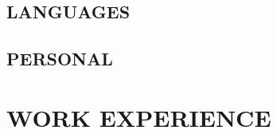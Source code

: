 \documentclass[10pt, a4paper]{article}
\begin{document}
\makeprofile %

\begincols






\subsection{LANGUAGES}
\langcircles %

\subsection{PERSONAL}
\perskills %


\switchcols %

\section{WORK EXPERIENCE}
\end{document}
